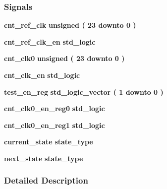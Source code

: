 \subsubsection*{Signals}
 \begin{DoxyCompactItemize}
\item 
{\bf cnt\+\_\+ref\+\_\+clk} {\bfseries \textcolor{comment}{unsigned}\textcolor{vhdlchar}{ }\textcolor{vhdlchar}{(}\textcolor{vhdlchar}{ }\textcolor{vhdlchar}{ } \textcolor{vhdldigit}{23} \textcolor{vhdlchar}{ }\textcolor{keywordflow}{downto}\textcolor{vhdlchar}{ }\textcolor{vhdlchar}{ } \textcolor{vhdldigit}{0} \textcolor{vhdlchar}{ }\textcolor{vhdlchar}{)}\textcolor{vhdlchar}{ }} 
\item 
{\bf cnt\+\_\+ref\+\_\+clk\+\_\+en} {\bfseries \textcolor{comment}{std\+\_\+logic}\textcolor{vhdlchar}{ }} 
\item 
{\bf cnt\+\_\+clk0} {\bfseries \textcolor{comment}{unsigned}\textcolor{vhdlchar}{ }\textcolor{vhdlchar}{(}\textcolor{vhdlchar}{ }\textcolor{vhdlchar}{ } \textcolor{vhdldigit}{23} \textcolor{vhdlchar}{ }\textcolor{keywordflow}{downto}\textcolor{vhdlchar}{ }\textcolor{vhdlchar}{ } \textcolor{vhdldigit}{0} \textcolor{vhdlchar}{ }\textcolor{vhdlchar}{)}\textcolor{vhdlchar}{ }} 
\item 
{\bf cnt\+\_\+clk\+\_\+en} {\bfseries \textcolor{comment}{std\+\_\+logic}\textcolor{vhdlchar}{ }} 
\item 
{\bf test\+\_\+en\+\_\+reg} {\bfseries \textcolor{comment}{std\+\_\+logic\+\_\+vector}\textcolor{vhdlchar}{ }\textcolor{vhdlchar}{(}\textcolor{vhdlchar}{ }\textcolor{vhdlchar}{ } \textcolor{vhdldigit}{1} \textcolor{vhdlchar}{ }\textcolor{keywordflow}{downto}\textcolor{vhdlchar}{ }\textcolor{vhdlchar}{ } \textcolor{vhdldigit}{0} \textcolor{vhdlchar}{ }\textcolor{vhdlchar}{)}\textcolor{vhdlchar}{ }} 
\item 
{\bf cnt\+\_\+clk0\+\_\+en\+\_\+reg0} {\bfseries \textcolor{comment}{std\+\_\+logic}\textcolor{vhdlchar}{ }} 
\item 
{\bf cnt\+\_\+clk0\+\_\+en\+\_\+reg1} {\bfseries \textcolor{comment}{std\+\_\+logic}\textcolor{vhdlchar}{ }} 
\item 
{\bf current\+\_\+state} {\bfseries {\bfseries {\bf state\+\_\+type}} \textcolor{vhdlchar}{ }} 
\item 
{\bf next\+\_\+state} {\bfseries {\bfseries {\bf state\+\_\+type}} \textcolor{vhdlchar}{ }} 
\end{DoxyCompactItemize}


\subsubsection{Detailed Description}


